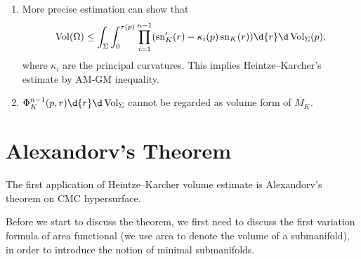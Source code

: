 \begin{rem}
    \begin{enumerate}[(1)]
        \item More precise estimation can show that
        \[\Vol(\Omega)\leq\int_\Sigma\int_0^{\tau(p)}\prod_{i=1}^{n-1}(\sn'_K(r)-\kappa_i(p)\sn_K(r))\d{r}\d\Vol_\Sigma(p),\]
        where $\kappa_i$ are the principal curvatures.
        This implies Heintze--Karcher's estimate by AM-GM inequality.
        \item $\Phi_K^{n-1}(p,r)\d{r}\d\Vol_\Sigma$ cannot be regarded as volume form of $M_K$.
    \end{enumerate}
\end{rem}

\section{Alexandorv's Theorem}

The first application of Heintze--Karcher volume estimate is Alexandorv's theorem on CMC hypersurface.

Before we start to discuss the theorem, we first need to discuss the first variation formula of area functional (we use area to denote the volume of a submanifold), in order to introduce the notion of minimal submanifolds.

